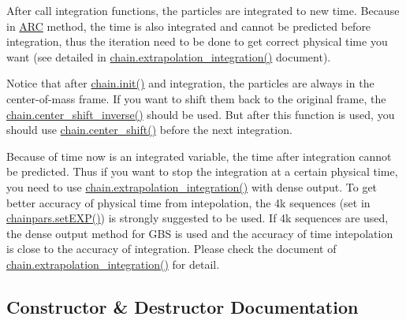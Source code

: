 \begin{DoxyEnumerate}
\item After call integration functions, the particles are integrated to new time. Because in \hyperlink{namespaceARC}{A\+RC} method, the time is also integrated and cannot be predicted before integration, thus the iteration need to be done to get correct physical time you want (see detailed in \hyperlink{classARC_1_1chain_a0eb7768cb1b9099bbf66124d4c00164c}{chain.\+extrapolation\+\_\+integration()} document).
\item Notice that after \hyperlink{classARC_1_1chain_aa016cf633d19079dca24565b80a36a3f}{chain.\+init()} and integration, the particles are always in the center-\/of-\/mass frame. If you want to shift them back to the original frame, the \hyperlink{classARC_1_1chain_a52edc1843550578f5be5590b7403ef97}{chain.\+center\+\_\+shift\+\_\+inverse()} should be used. But after this function is used, you should use \hyperlink{classARC_1_1chain_a68ae268afb418455bfdd6e8101b3b4eb}{chain.\+center\+\_\+shift()} before the next integration.
\end{DoxyEnumerate}

Because of time now is an integrated variable, the time after integration cannot be predicted. Thus if you want to stop the integration at a certain physical time, you need to use \hyperlink{classARC_1_1chain_a0eb7768cb1b9099bbf66124d4c00164c}{chain.\+extrapolation\+\_\+integration()} with dense output. To get better accuracy of physical time from intepolation, the 4k sequences (set in \hyperlink{classARC_1_1chainpars_a1bef542db30755ac35cf064446874f6d}{chainpars.\+set\+E\+X\+P()}) is strongly suggested to be used. If 4k sequences are used, the dense output method for G\+BS is used and the accuracy of time intepolation is close to the accuracy of integration. Please check the document of \hyperlink{classARC_1_1chain_a0eb7768cb1b9099bbf66124d4c00164c}{chain.\+extrapolation\+\_\+integration()} for detail. 

\subsection{Constructor \& Destructor Documentation}
\hypertarget{classARC_1_1chain_a6bea4b3b275ff07d8caa924fdd07852b}{}\label{classARC_1_1chain_a6bea4b3b275ff07d8caa924fdd07852b} 
